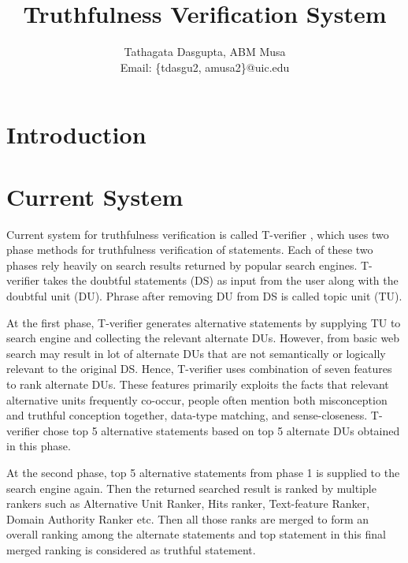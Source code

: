 \documentclass[11pt]{article}
\begin{document}
\title{Truthfulness Verification System}

\author{
Tathagata Dasgupta, ABM Musa\\
Email: \{tdasgu2, amusa2\}@uic.edu
}

\date{}
\maketitle


\section{Introduction}



\section{Current System}
Current system for truthfulness verification is called T-verifier \cite{tverifier}, which uses two phase methods for truthfulness verification of statements. Each of these two phases rely heavily on search results returned by popular search engines. T-verifier takes the doubtful statements (DS) as input from the user along with the doubtful unit (DU). Phrase after removing DU from DS is called topic unit (TU).

At the first phase, T-verifier generates alternative statements by supplying TU to search engine and collecting the relevant alternate DUs. However, from basic web search may result in lot of alternate DUs that are not semantically or logically relevant to the original DS. Hence, T-verifier uses combination of seven features to rank alternate DUs. These features primarily exploits the facts that relevant alternative units frequently co-occur, people often mention both misconception and truthful conception together, data-type matching, and sense-closeness. T-verifier chose top 5 alternative statements based on top 5 alternate DUs obtained in this phase. 

At the second phase, top 5 alternative statements from phase 1 is supplied to the search engine again. Then the returned searched result is ranked by multiple rankers such as Alternative Unit Ranker, Hits ranker, Text-feature Ranker, Domain Authority Ranker etc. Then all those ranks are merged to form an overall ranking among the alternate statements and top statement in this final merged ranking is considered as truthful statement. 

%
%
%
\end{document}
